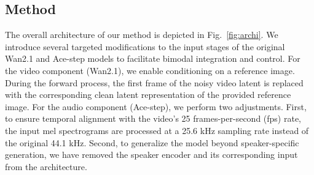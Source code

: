 \subsection{Method}
The overall architecture of our method is depicted in Fig.~\ref{fig:archi}. We introduce several targeted modifications to the input stages of the original Wan2.1 and Ace-step models to facilitate bimodal integration and control.
For the video component (Wan2.1), we enable conditioning on a reference image. During the forward process, the first frame of the noisy video latent is replaced with the corresponding clean latent representation of the provided reference image.
For the audio component (Ace-step), we perform two adjustments. First, to ensure temporal alignment with the video's 25 frames-per-second (fps) rate, the input mel spectrograms are processed at a 25.6 kHz sampling rate instead of the original 44.1 kHz. Second, to generalize the model beyond speaker-specific generation, we have removed the speaker encoder and its corresponding input from the architecture.


